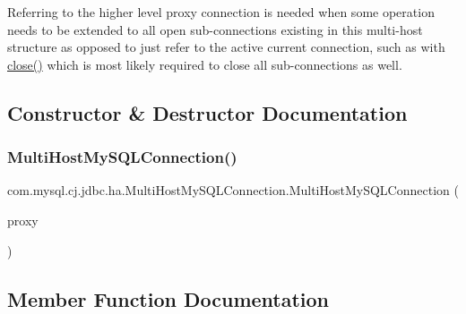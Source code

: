 Referring to the higher level proxy connection is needed when some operation needs to be extended to all open sub-\/connections existing in this multi-\/host structure as opposed to just refer to the active current connection, such as with \mbox{\hyperlink{classcom_1_1mysql_1_1cj_1_1jdbc_1_1ha_1_1_multi_host_my_s_q_l_connection_a395d1a2ad3c87af7cc97a6a516b601f2}{close()}} which is most likely required to close all sub-\/connections as well. 

\subsection{Constructor \& Destructor Documentation}
\mbox{\label{classcom_1_1mysql_1_1cj_1_1jdbc_1_1ha_1_1_multi_host_my_s_q_l_connection_ab742e8241444987701d70af53732d8e6}} 
\subsubsection{\texorpdfstring{Multi\+Host\+My\+S\+Q\+L\+Connection()}{MultiHostMySQLConnection()}}
{\footnotesize\ttfamily com.\+mysql.\+cj.\+jdbc.\+ha.\+Multi\+Host\+My\+S\+Q\+L\+Connection.\+Multi\+Host\+My\+S\+Q\+L\+Connection (\begin{DoxyParamCaption}\item[{\mbox{\hyperlink{classcom_1_1mysql_1_1cj_1_1jdbc_1_1ha_1_1_multi_host_connection_proxy}{Multi\+Host\+Connection\+Proxy}}}]{proxy }\end{DoxyParamCaption})}



\subsection{Member Function Documentation}
\mbox{\label{classcom_1_1mysql_1_1cj_1_1jdbc_1_1ha_1_1_multi_host_my_s_q_l_connection_a81b223cea2f0bcd0c7d94d1786063ea0}} 
